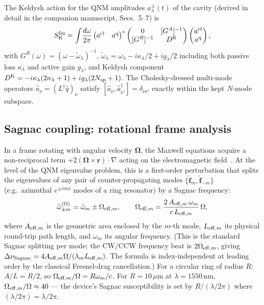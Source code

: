 \documentclass[11pt]{article}
\newcommand{\eff}{{\rm eff}}
\newcommand{\cl}{{\rm cl}}
\newcommand{\q}{{\rm q}}
\newcommand{\K}{{\rm K}}
\newcommand{\tf}{\tilde{\mathbf{f}}}
\newcommand{\tomega}{\tilde{\omega}}
\begin{document}
The Keldysh action for the QNM amplitudes $a^\pm_\lambda(t)$ of the
cavity (derived in detail in the companion manuscript, Secs.~5--7) is
\begin{equation}
  S_\K^{\rm lin} = \int\!\frac{d\omega}{2\pi}
  \begin{pmatrix}a^\cl & a^\q\end{pmatrix}^*
  \begin{pmatrix}0 & [G^A]^{-1}\\ [G^R]^{-1} & D^\K\end{pmatrix}
  \begin{pmatrix}a^\cl\\ a^\q\end{pmatrix},
\end{equation}
with $G^R(\omega) = (\omega - \tomega_\lambda)^{-1}$,
$\tomega_\lambda = \omega_\lambda - i\kappa_\lambda/2 + i g_\lambda/2$
including both passive loss $\kappa_\lambda$ and active gain
$g_\lambda$, and Keldysh component
$D^\K = -i\kappa_\lambda(2n_\lambda+1) + ig_\lambda(2N_{\rm sp}+1)$.
The Cholesky-dressed multi-mode operators
$\hat a_\nu = (L^\dagger\hat q)_\nu$ satisfy
$[\hat a_\nu,\hat a_{\nu'}^\dagger]=\delta_{\nu\nu'}$ exactly within
the kept $N$-mode subspace.

\subsection{Sagnac coupling: rotational frame analysis}
\label{sec:sagnac}

In a frame rotating with angular velocity $\boldsymbol{\Omega}$, the
Maxwell equations acquire a non-reciprocal term
$+2(\boldsymbol{\Omega}\times\mathbf{r})\cdot\nabla$ acting on the
electromagnetic field~\cite{Sagnac1913,PostSagnac1967}.  At the level
of the QNM eigenvalue problem, this is a first-order perturbation that
splits the eigenvalues of any pair of counter-propagating modes
$\{\tf_{m}, \tf_{-m}\}$ (e.g.\ azimuthal $e^{\pm i m\phi}$ modes of a
ring resonator) by a Sagnac frequency:
\begin{equation}
  \tomega_{\pm m}^{(\Omega)} = \tomega_m \pm \Omega_{\eff,m},
  \qquad
  \Omega_{\eff,m} = \frac{2\,A_{\eff,m}\,\omega_m}{c\,L_{\eff,m}}\,\Omega,
  \label{eq:sagnac_shift}
\end{equation}
where $A_{\eff,m}$ is the geometric area enclosed by the $m$-th mode,
$L_{\eff,m}$ its physical round-trip path length, and $\omega_m$ its
angular frequency.  (This is the standard Sagnac splitting per mode;
the CW/CCW frequency beat is $2\Omega_{\eff,m}$, giving
$\Delta\nu_{\rm Sagnac} = 4 A_{\eff,m}\Omega/(\lambda_m L_{\eff,m})$.
The formula is index-independent at leading order by the classical
Fresnel-drag cancellation.)  For a circular ring of radius $R$:
$A/L = R/2$, so $\Omega_{\eff,m}/\Omega = R\omega_m/c$.
For $R=10\,\mu\mathrm{m}$ at $\lambda=1550\,\mathrm{nm}$,
$\Omega_{\eff,m}/\Omega \approx 40$ --- the device's Sagnac
susceptibility is set by $R/(\lambda/2\pi)$ where $(\lambda/2\pi)=\lambda/2\pi$.
\end{document}
